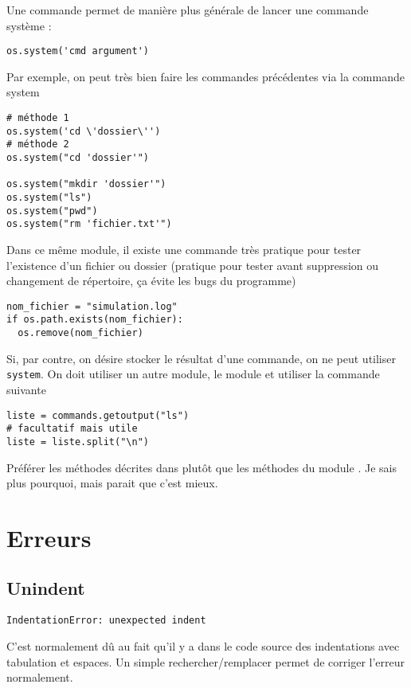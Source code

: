 \documentclass[a4paper,twoside]{article}
\begin{document}
Une commande permet de manière plus générale de lancer une commande système :
\begin{verbatim}
os.system('cmd argument')
\end{verbatim}

Par exemple, on peut très bien faire les commandes précédentes via la commande system
\begin{verbatim}
# méthode 1
os.system('cd \'dossier\'')
# méthode 2
os.system("cd 'dossier'")

os.system("mkdir 'dossier'")
os.system("ls")
os.system("pwd")
os.system("rm 'fichier.txt'")
\end{verbatim}

Dans ce même module, il existe une commande très pratique pour tester l'existence d'un fichier ou dossier (pratique pour tester avant suppression ou changement de répertoire, ça évite les bugs du programme)
\begin{verbatim}
nom_fichier = "simulation.log"
if os.path.exists(nom_fichier):
  os.remove(nom_fichier)
\end{verbatim}


Si, par contre, on désire stocker le résultat d'une commande, on ne peut utiliser \texttt{system}. On doit utiliser un autre module, le module  et utiliser la commande suivante
\begin{verbatim}
liste = commands.getoutput("ls")
# facultatif mais utile
liste = liste.split("\n")
\end{verbatim}

\begin{attention}
Préférer les méthodes décrites dans  plutôt que les méthodes du module . Je sais plus pourquoi, mais parait que c'est mieux.
\end{attention}

\section{Erreurs}
\subsection{Unindent}
\begin{verbatim}
IndentationError: unexpected indent
\end{verbatim}

C'est normalement dû au fait qu'il y a dans le code source des indentations avec tabulation et espaces. Un simple rechercher/remplacer permet de corriger l'erreur normalement.
\end{document}
